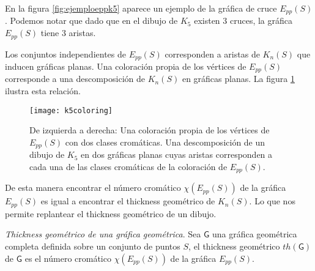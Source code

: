 En la figura \ref{fig:ejemploeppk5} aparece un ejemplo de la gráfica de cruce $E_{pp}(S)$.
Podemos notar que dado que en el dibujo de $K_5$ existen 3 cruces, la gráfica $E_{pp}(S)$
tiene 3 aristas.

Los conjuntos independientes de $E_{pp}(S)$ corresponden a aristas de $K_n(S)$
que inducen gráficas planas. Una coloración propia de los vértices de $E_{pp}(S)$
corresponde a una descomposición de $K_n(S)$ en gráficas planas.
La figura \ref{fig:k5coloring} ilustra esta relación.

\begin{figure}
  \centering
  \texttt{[image: k5coloring]}
  \caption{De izquierda a derecha: Una coloración propia de los vértices de $E_{pp}(S)$ con dos
  clases cromáticas. Una descomposición de un dibujo de $K_5$ en dos gráficas planas
  cuyas aristas corresponden a cada una de las clases cromáticas de la coloración
  de $E_{pp}(S)$.}
  \label{fig:k5coloring}
\end{figure}

De esta manera encontrar el número cromático $\chi(E_{pp}(S))$ de la gráfica
$E_{pp}(S)$ es igual a encontrar el thickness geométrico de $K_n(S)$.
Lo que nos permite replantear el thickness geométrico de un dibujo.

\begin{definition}{\emph{Thickness geométrico de una gráfica geométrica}.}
Sea $\mathsf{G}$ una gráfica geométrica completa definida sobre un conjunto de puntos $S$,
el thickness geométrico $th(\mathsf{G})$ de $\mathsf{G}$ es el número cromático
$\chi(E_{pp}(S))$ de la gráfica $E_{pp}(S)$.
\end{definition}

